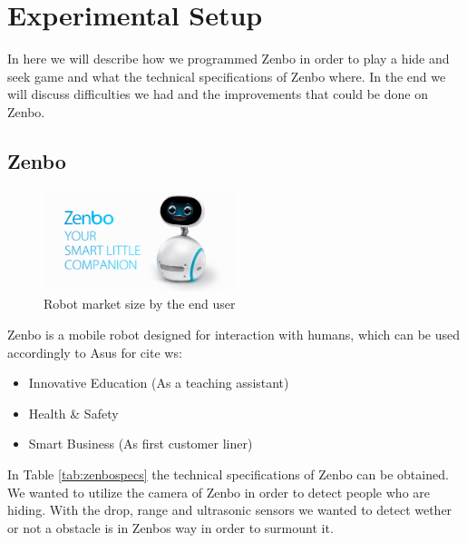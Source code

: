 \documentclass[conference]{IEEEtran}
\begin{document}
\section{Experimental Setup}
In here we will describe how we programmed Zenbo in order to play a hide and seek game and what the technical specifications 
of Zenbo where. In the end we will discuss difficulties we had and the improvements that could be done on Zenbo.\\
\subsection{Zenbo}
\begin{figure}[h]  \label{fig:zenbopic}
	\begin{center}
		\includegraphics[width=0.5\textwidth]{pics/ZenboPicture.jpg}
	\end{center}
	\caption{Robot market size by the end user}
\end{figure}
Zenbo is a mobile robot designed for interaction with humans, which can be used accordingly to Asus for \cite{b6} cite ws:
\begin{itemize}
	\item Innovative Education (As a teaching assistant)
	\item Health \& Safety
	\item Smart Business (As first customer liner)
\end{itemize}
In Table \ref{tab:zenbospecs} the technical specifications of Zenbo can be obtained. We wanted to utilize the camera of Zenbo in order to detect 
people who are hiding. With the drop, range and ultrasonic sensors we wanted to detect wether or not a obstacle is in Zenbos way in order to surmount it.
\end{document}
